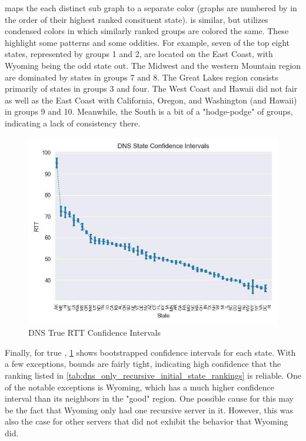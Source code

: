  maps the each distinct sub graph to a separate color (graphs are numbered by in the order of their highest ranked consituent state).  is similar, but utilizes condensed colors in which similarly ranked groups are colored the same. These highlight some patterns and some oddities. For example, seven of the top eight states, represented by groups 1 and 2, are located on the East Coast, with Wyoming being the odd state out. The Midwest and the western Mountain region are dominated by states in groups 7 and 8. The Great Lakes region consists primarily of states in groups 3 and four. The West Coast and Hawaii did not fair as well as the East Coast with California, Oregon, and Washington (and Hawaii) in groups 9 and 10. Meanwhile, the South is a bit of a "hodge-podge" of groups, indicating a lack of consistency there.


\begin{figure}[H]
    \centering
    \includegraphics[width=\textwidth]{images/dns/analysis_no_auth_agg/rtt/no_auth_agg_rtt_confidence.jpg}
    \caption{DNS True RTT Confidence Intervals}
    \label{fig:dns_true_rtt_confidence_intervals}
\end{figure}

Finally, for true \rtt, \cref{fig:dns_true_rtt_confidence_intervals} shows bootstrapped confidence intervals for each state. With a few exceptions, bounds are fairly tight, indicating high confidence that the ranking listed in \cref{tab:dns_only_recursive_initial_state_rankings} is reliable. One of the notable exceptions is Wyoming, which has a much higher confidence interval than its neighbors in the "good" \rtt region. One possible cause for this may be the fact that Wyoming only had one recursive server in it. However, this was also the case for other servers that did not exhibit the behavior that Wyoming did.

